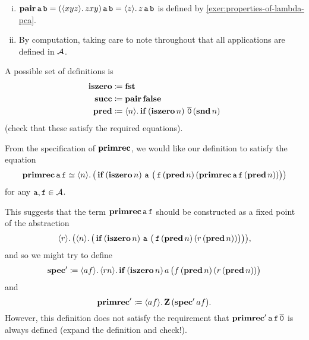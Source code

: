 

\begin{enumerate}[(i)]
  \item
    \( \pcapair \pca a \pca b =
      (\lambdapca{xyz}{zxy}) \pca a \pca b =
      \lambdapca{z}{z \pca a \pca b}\)
    is defined by \cref{exer:properties-of-lambda-pca}.

  \item
    By computation, taking care to note throughout that all applications are
    defined in \(\AA\).
\end{enumerate}



A possible set of definitions is
\begin{align*}
    \pcaiszero & \defeq \pcafst \\
    \pcasucc & \defeq \pcapair \pcafalse \\
    \pcapred & \defeq \lambdapca{n}{\pcaif\,(\pcaiszero n)\,\numeral{0}\,(\pcasnd n)}
\end{align*}
(check that these satisfy the required equations).




\newcommand\spec{\pcacomb{spec}}

From the specification of  \(\pcarec\), we would like our definition to satisfy
the equation
\[ \pcarec \pca{a} \pca{f} \simeq
  \lambdapca{n}{\big(
    \pcaif \, (\pcaiszero n) \,
      \pca{a} \,
      \big(\pca{f} \, (\pcapred n) \, (\pcarec \pca{a} \pca{f} \, (\pcapred n))\big)
  \big)}
\]
for any \(\pca a, \pca f \in \AA\).

This suggests that the term \(\pcarec \pca{a} \pca{f}\) should be constructed as
a fixed point of the abstraction
\begin{equation} \label{eq:spec}
\lambdapca{r}{\big(
  \lambdapca{n}{\big(
    \pcaif \, (\pcaiszero n) \,
      \pca{a} \,
      \big(\pca{f} \, (\pcapred n) \, (r \, (\pcapred n))\big)
  \big)}
\big)},
\end{equation}
and so we might try to define
\[ \spec^\prime \defeq
\lambdapca{af}{\lambdapca{rn}{
  \pcaif \, (\pcaiszero n) \,
    a \,
    \big(f \, (\pcapred n) \, (r \, (\pcapred n))\big)
}}
\]
and
\[ \pcarec^\prime \defeq \lambdapca{af}{\pcaz \, (\spec^\prime a f)}. \]
However, this definition does not satisfy the requirement that
\(\pcarec^\prime \pca{a} \pca{f} \numeral{0}\) is always defined (expand the
definition and check!).

